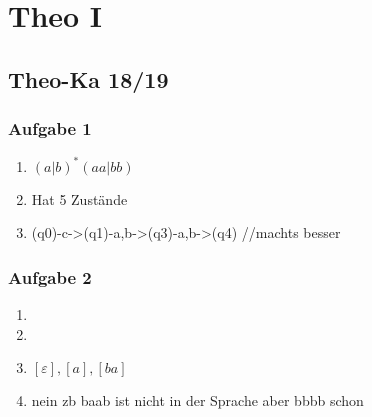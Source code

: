 \documentclass[12pt]{scrartcl}
\begin{document}
	
\section{Theo I}

\subsection{Theo-Ka 18/19}

\subsubsection{Aufgabe 1}
	\begin{enumerate}
		\item \( (a|b)^{*}(aa|bb) \)
		\item Hat 5 Zustände
		\item (q0)-c->(q1)-a,b->(q3)-a,b->(q4) //machts besser
	\end{enumerate}
	
\subsubsection{Aufgabe 2}
	\begin{enumerate}
		\item
		\item
		\item \( [\varepsilon], [a], [ba] \)
		\item nein zb baab ist nicht in der Sprache aber bbbb schon
	\end{enumerate}
	
\end{document}
